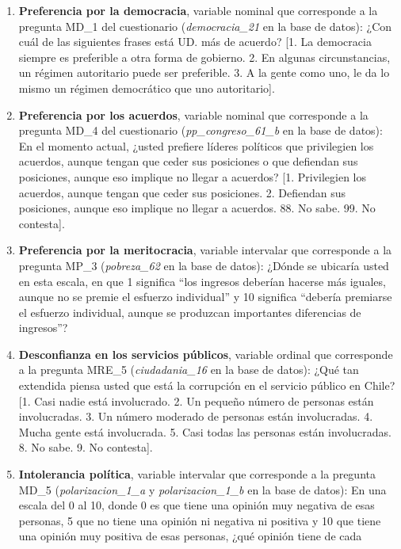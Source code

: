 \documentclass[
  spanish,
  a4paper,
  oneside]{scrbook}
\begin{document}
\begin{enumerate}
\def\labelenumi{\arabic{enumi}.}
\item
  \textbf{Preferencia por la democracia}, variable nominal que
  corresponde a la pregunta MD\_1 del cuestionario
  (\emph{democracia\_21} en la base de datos): ¿Con cuál de las
  siguientes frases está UD. más de acuerdo? {[}1. La democracia siempre
  es preferible a otra forma de gobierno. 2. En algunas circunstancias,
  un régimen autoritario puede ser preferible. 3. A la gente como uno,
  le da lo mismo un régimen democrático que uno autoritario{]}.
\item
  \textbf{Preferencia por los acuerdos}, variable nominal que
  corresponde a la pregunta MD\_4 del cuestionario
  (\emph{pp\_congreso\_61\_b} en la base de datos): En el momento
  actual, ¿usted prefiere líderes políticos que privilegien los
  acuerdos, aunque tengan que ceder sus posiciones o que defiendan sus
  posiciones, aunque eso implique no llegar a acuerdos? {[}1.
  Privilegien los acuerdos, aunque tengan que ceder sus posiciones. 2.
  Defiendan sus posiciones, aunque eso implique no llegar a acuerdos.
  88. No sabe. 99. No contesta{]}.
\item
  \textbf{Preferencia por la meritocracia}, variable intervalar que
  corresponde a la pregunta MP\_3 (\emph{pobreza\_62} en la base de
  datos): ¿Dónde se ubicaría usted en esta escala, en que 1 significa
  ``los ingresos deberían hacerse más iguales, aunque no se premie el
  esfuerzo individual'' y 10 significa ``debería premiarse el esfuerzo
  individual, aunque se produzcan importantes diferencias de ingresos''?
\item
  \textbf{Desconfianza en los servicios públicos}, variable ordinal que
  corresponde a la pregunta MRE\_5 (\emph{ciudadania\_16} en la base de
  datos): ¿Qué tan extendida piensa usted que está la corrupción en el
  servicio público en Chile? {[}1. Casi nadie está involucrado. 2. Un
  pequeño número de personas están involucradas. 3. Un número moderado
  de personas están involucradas. 4. Mucha gente está involucrada. 5.
  Casi todas las personas están involucradas. 8. No sabe. 9. No
  contesta{]}.
\item
  \textbf{Intolerancia política}, variable intervalar que corresponde a
  la pregunta MD\_5 (\emph{polarizacion\_1\_a} y
  \emph{polarizacion\_1\_b} en la base de datos): En una escala del 0 al
  10, donde 0 es que tiene una opinión muy negativa de esas personas, 5
  que no tiene una opinión ni negativa ni positiva y 10 que tiene una
  opinión muy positiva de esas personas, ¿qué opinión tiene de cada

\end{enumerate}
\end{document}
